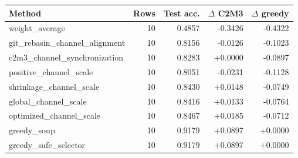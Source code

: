 \begin{tabular}{lrrrr}
\toprule
Method & Rows & Test acc. & $\Delta$ C2M3 & $\Delta$ greedy \\
\midrule
weight\_average & 10 & 0.4857 & -0.3426 & -0.4322 \\
git\_rebasin\_channel\_alignment & 10 & 0.8156 & -0.0126 & -0.1023 \\
c2m3\_channel\_synchronization & 10 & 0.8283 & +0.0000 & -0.0897 \\
positive\_channel\_scale & 10 & 0.8051 & -0.0231 & -0.1128 \\
shrinkage\_channel\_scale & 10 & 0.8430 & +0.0148 & -0.0749 \\
global\_channel\_scale & 10 & 0.8416 & +0.0133 & -0.0764 \\
optimized\_channel\_scale & 10 & 0.8467 & +0.0185 & -0.0712 \\
greedy\_soup & 10 & 0.9179 & +0.0897 & +0.0000 \\
greedy\_safe\_selector & 10 & 0.9179 & +0.0897 & +0.0000 \\
\bottomrule
\end{tabular}
